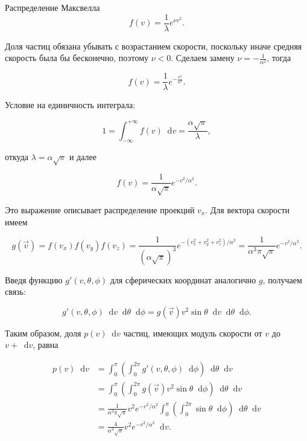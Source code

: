 \documentclass{article}
\renewcommand{\d}{\mathop{}\!\mathrm{d}}
\begin{document}
\begin{section}{Распределение Максвелла}
		\begin{equation*}
			f(v) = \frac{1}{\lambda} e^{\nu v^2}.
		\end{equation*}

		Доля частиц обязана убывать с возрастанием скорости, поскольку иначе средняя скорость была бы бесконечно, поэтому $\nu < 0$. Сделаем замену $\nu = -\frac{1}{\alpha^2}$, тогда

		\begin{equation*}
			f(v) = \frac{1}{\lambda} e^{-\frac{v^2}{\alpha^2}}.
		\end{equation*}

		Условие на единичность интеграла:

		\begin{equation*}
			1 = \int_{-\infty}^{+\infty} f(v) \d v = \frac{\alpha \sqrt{\pi}}{\lambda},
		\end{equation*}

		откуда $\lambda = \alpha \sqrt{\pi}$ и далее

		\begin{equation*}
			f(v) = \frac{1}{\alpha \sqrt{\pi}} e^{-v^2 / \alpha^2}.
		\end{equation*}

		Это выражение описывает распределение проекций $v_x$. Для вектора скорости имеем

		\begin{equation*}
			g(\vec{v}) = f(v_x) f(v_y) f(v_z) = \frac{1}{\left( \alpha \sqrt{\pi} \right)^3} e^{-(v_x^2 + v_y^2 + v_z^2) / \alpha^2} = \frac{1}{\alpha^3 \pi \sqrt{\pi}} e^{-v^2 / \alpha^2}.
		\end{equation*}

		Введя функцию $g'(v, \theta, \phi)$ для сферических координат аналогично $g$, получаем связь:

		\begin{equation*}
			g'(v, \theta, \phi) \d v \d \theta \d \phi = g(\vec{v}) v^2 \sin \theta \d v \d \theta \d \phi.
		\end{equation*}

		Таким образом, доля $p(v) \d v$ частиц, имеющих модуль скорости от $v$ до $v + \d v$, равна

		\begin{align*}
			p(v) \d v &= \int_0^\pi \left( \int_0^{2\pi} g'(v, \theta, \phi) \d \phi \right) \d \theta \d v \\
			&= \int_0^\pi \left( \int_0^{2\pi} g(\vec{v}) v^2 \sin \theta \d \phi \right) \d \theta \d v \\
			&= \frac{1}{\alpha^3 \pi \sqrt{\pi}} v^2 e^{-v^2/\alpha^2} \int_0^\pi \left( \int_0^{2\pi} \sin \theta \d \phi \right) \d \theta \d v \\
			&= \frac{4}{\alpha^3 \sqrt{\pi}} v^2 e^{-v^2/\alpha^2} \d v.
		\end{align*}


\end{section}
\end{document}
